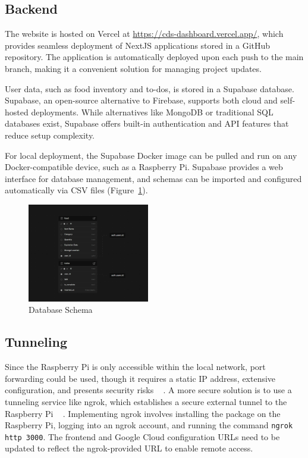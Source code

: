 \subsection{Backend}
The website is hosted on Vercel at \url{https://cds-dashboard.vercel.app/}, which provides seamless deployment of NextJS applications stored in a GitHub repository. The application is automatically deployed upon each push to the main branch, making it a convenient solution for managing project updates.

User data, such as food inventory and to-dos, is stored in a Supabase database. Supabase, an open-source alternative to Firebase, supports both cloud and self-hosted deployments. While alternatives like MongoDB or traditional SQL databases exist, Supabase offers built-in authentication and API features that reduce setup complexity.

For local deployment, the Supabase Docker image can be pulled and run on any Docker-compatible device, such as a Raspberry Pi. Supabase provides a web interface for database management, and schemas can be imported and configured automatically via CSV files (Figure~\ref{fig:schema}).

\begin{figure}[H]
\centering
\includegraphics[width=0.475\textwidth]{media/database.png}
\caption{Database Schema}
\label{fig:schema}
\end{figure}

\subsection{Tunneling}
Since the Raspberry Pi is only accessible within the local network, port forwarding could be used, though it requires a static IP address, extensive configuration, and presents security risks
~\cite{wang_port_2024}
. A more secure solution is to use a tunneling service like ngrok, which establishes a secure external tunnel to the Raspberry Pi
~\cite{ngrok_documentation}
. Implementing ngrok involves installing the package on the Raspberry Pi, logging into an ngrok account, and running the command \texttt{ngrok http 3000}. The frontend and Google Cloud configuration URLs need to be updated to reflect the ngrok-provided URL to enable remote access.

